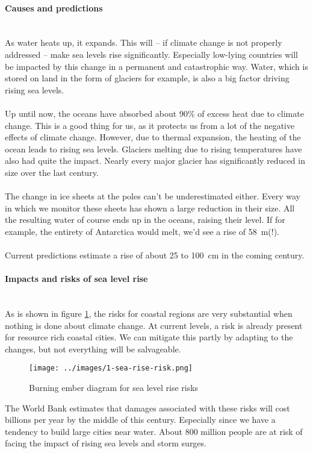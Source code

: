 \documentclass[../summary.tex]{subfiles}
\begin{document}
\paragraph{Causes and predictions}\mbox{}
\\
As water heats up, it expands. This will -- if climate change is not properly addressed -- make sea levels rise significantly. Especially low-lying countries will be impacted by this change in a permanent and catastrophic way. Water, which is stored on land in the form of glaciers for example, is also a big factor driving rising sea levels.
\\\\
Up until now, the oceans have absorbed about 90\% of excess heat due to climate change. This is a good thing for us, as it protects us from a lot of the negative effects of climate change. However, due to thermal expansion, the heating of the ocean leads to rising sea levels. Glaciers melting due to rising temperatures have also had quite the impact. Nearly every major glacier has significantly reduced in size over the last century.
\\\\
The change in ice sheets at the poles can't be underestimated either. Every way in which we monitor these sheets has shown a large reduction in their size. All the resulting water of course ends up in the oceans, raising their level. If for example, the entirety of Antarctica would melt, we'd see a rise of \SI{58}{\metre}(!).
\\\\
Current predictions estimate a rise of about 25 to \SI{100}{\centi\metre} in the coming century.

\paragraph{Impacts and risks of sea level rise}\mbox{}
\\
As is shown in figure \ref{fig:sea-rise-risk}, the risks for coastal regions are very substantial when nothing is done about climate change. At current levels, a risk is already present for resource rich coastal cities. We can mitigate this partly by adapting to the changes, but not everything will be salvageable.
\\
\begin{figure}[h]
	\centering
	\texttt{[image: ../images/1-sea-rise-risk.png]}
	\caption{Burning ember diagram for sea level rise risks}
	\label{fig:sea-rise-risk}
\end{figure}

The World Bank estimates that damages associated with these risks will cost billions per year by the middle of this century. Especially since we have a tendency to build large cities near water. About 800 million people are at risk of facing the impact of rising sea levels and storm surges.
\end{document}
